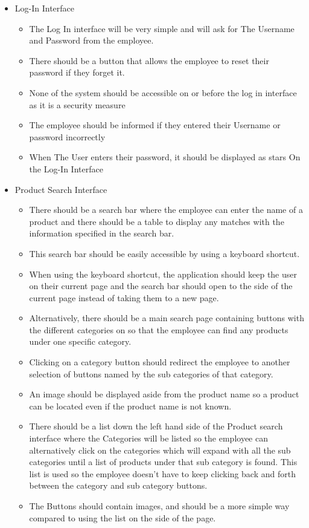 \begin{itemize}
	\item Log-In Interface
	\begin{itemize}
		\item The Log In interface will be very simple and will ask for The Username and Password from the employee.
		\item There should be a button that allows the employee to reset their password if they forget it.
		\item None of the system should be accessible on or before the log in interface as it is a security measure
		\item The employee should be informed if they entered their Username or password incorrectly
		\item When The User enters their password, it should be displayed as stars On the Log-In Interface
	\end{itemize}

	\item Product Search Interface
	\begin{itemize}
		\item There should be a search bar where the employee can enter the name of a product and there should be a table to display any matches with the information specified in the search bar.
		\item This search bar should be easily accessible by using a keyboard shortcut.
		\item When using the keyboard shortcut, the application should keep the user on their current page and the search bar should open to the side of the current page instead of taking them to a new page.
		\item Alternatively, there should be a main search page containing buttons with the different categories on so that the employee can find any products under one specific category.
		\item Clicking on a category button should redirect the employee to another selection of buttons named by the sub categories of that category.
		\item An image should be displayed aside from the product name so a product can be located even if the product name is not known.
		\item There should be a list down the left hand side of the Product search interface where the Categories will be listed so the employee can alternatively click on the categories which will expand with all the sub categories until a list of products under that sub category is found. This list is used so the employee doesn’t have to keep clicking back and forth between the category and sub category buttons.
		\item The Buttons should contain images, and should be a more simple way compared to using the list on the side of the page.
	\end{itemize}


\end{itemize}
